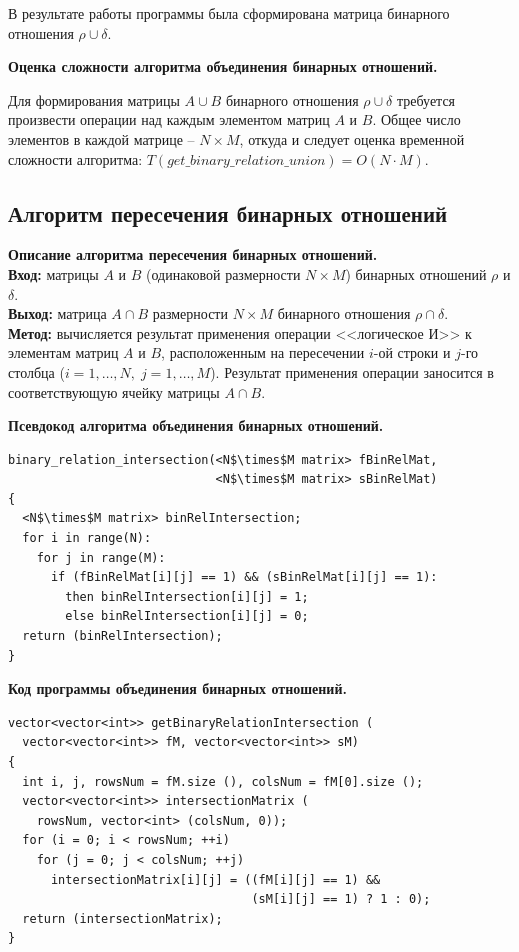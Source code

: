 \documentclass[spec, och, otchet, hidelinks]{SCWorks}
\newcommand{\tbf}[1]{\textbf{#1}}
\begin{document}
В результате работы программы была сформирована матрица бинарного отношения
$\rho \cup \delta$. \\

\par \tbf{Оценка сложности алгоритма объединения бинарных отношений.}

\par Для формирования матрицы $A \cup B$ бинарного отношения $\rho \cup \delta$
требуется произвести операции над каждым элементом матриц $A$ и $B$. Общее число
элементов в каждой матрице -- $N \times M$, откуда и следует оценка временной
сложности алгоритма: $T(get\_binary\_relation\_union) = O(N \cdot M)$.

\newpage

\subsection{Алгоритм пересечения бинарных отношений}
\par \tbf{Описание алгоритма пересечения бинарных отношений.} \\
\tbf{Вход:} матрицы $A$ и $B$ (одинаковой размерности $N \times M$) бинарных отношений $\rho$ и $\delta$. \\
\tbf{Выход:} матрица $A \cap B$ размерности $N \times M$ бинарного отношения
$\rho \cap \delta$. \\
\tbf{Метод:} вычисляется результат применения операции <<логическое И>> к
элементам матриц $A$ и $B$, расположенным на пересечении $i$-ой строки и $j$-го
столбца ($i = 1,\dots,N, \; j = 1,\dots,M$). Результат применения операции
заносится в соответствующую ячейку матрицы $A \cap B$. \\

\par \tbf{Псевдокод алгоритма объединения бинарных отношений.}

\begin{lstlisting}[caption=Псевдокод алгоритма., mathescape]
binary_relation_intersection(<N$\times$M matrix> fBinRelMat,
                             <N$\times$M matrix> sBinRelMat)
{
  <N$\times$M matrix> binRelIntersection;
  for i in range(N):
    for j in range(M):
      if (fBinRelMat[i][j] == 1) && (sBinRelMat[i][j] == 1):
        then binRelIntersection[i][j] = 1; 
        else binRelIntersection[i][j] = 0;
  return (binRelIntersection);
}
\end{lstlisting}

\par \tbf{Код программы объединения бинарных отношений.}
\begin{lstlisting}[caption=Код программы., mathescape]
vector<vector<int>> getBinaryRelationIntersection (
  vector<vector<int>> fM, vector<vector<int>> sM)
{
  int i, j, rowsNum = fM.size (), colsNum = fM[0].size ();
  vector<vector<int>> intersectionMatrix (
    rowsNum, vector<int> (colsNum, 0));
  for (i = 0; i < rowsNum; ++i)
    for (j = 0; j < colsNum; ++j)
      intersectionMatrix[i][j] = ((fM[i][j] == 1) && 
                                  (sM[i][j] == 1) ? 1 : 0);
  return (intersectionMatrix);
}
\end{lstlisting}
\end{document}
